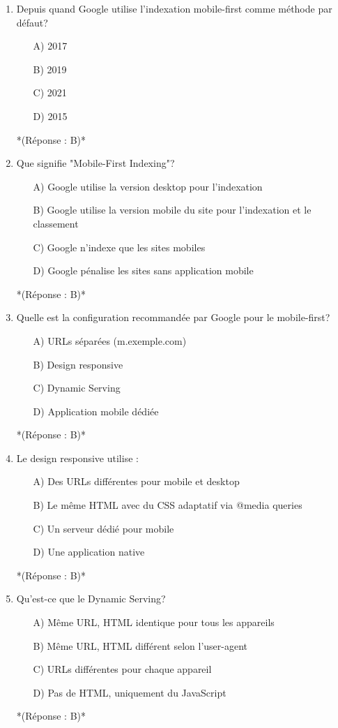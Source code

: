 \documentclass[12pt,a4paper,twoside]{report}
\begin{document}
\begin{enumerate}
\item Depuis quand Google utilise l'indexation mobile-first comme méthode par défaut?
\begin{itemize}
\item[A)] 2017
\item[B)] 2019
\item[C)] 2021
\item[D)] 2015
\end{itemize}
*(Réponse : B)*

\item Que signifie "Mobile-First Indexing"?
\begin{itemize}
\item[A)] Google utilise la version desktop pour l'indexation
\item[B)] Google utilise la version mobile du site pour l'indexation et le classement
\item[C)] Google n'indexe que les sites mobiles
\item[D)] Google pénalise les sites sans application mobile
\end{itemize}
*(Réponse : B)*

\item Quelle est la configuration recommandée par Google pour le mobile-first?
\begin{itemize}
\item[A)] URLs séparées (m.exemple.com)
\item[B)] Design responsive
\item[C)] Dynamic Serving
\item[D)] Application mobile dédiée
\end{itemize}
*(Réponse : B)*

\item Le design responsive utilise :
\begin{itemize}
\item[A)] Des URLs différentes pour mobile et desktop
\item[B)] Le même HTML avec du CSS adaptatif via @media queries
\item[C)] Un serveur dédié pour mobile
\item[D)] Une application native
\end{itemize}
*(Réponse : B)*

\item Qu'est-ce que le Dynamic Serving?
\begin{itemize}
\item[A)] Même URL, HTML identique pour tous les appareils
\item[B)] Même URL, HTML différent selon l'user-agent
\item[C)] URLs différentes pour chaque appareil
\item[D)] Pas de HTML, uniquement du JavaScript
\end{itemize}
*(Réponse : B)*


\end{enumerate}
\end{document}
